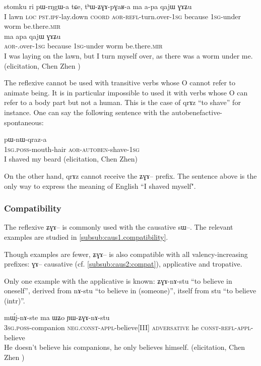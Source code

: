 \documentclass[oldfontcommands,oneside,a4paper,11pt]{memoir}
\newcommand{\ipa}[1]{{\phon #1}} %
\newcommand{\wav}[1]{}%
\newcommand{\appl}{\textsc{appl}}
\newcommand{\aor}{\textsc{aor}}
\newcommand{\auto}{\textsc{autoben}}
\newcommand{\coord}{\textsc{coord}}
\newcommand{\const}{\textsc{const}}
\newcommand{\ipf}{\textsc{ipf}}
\newcommand{\loc}{\textsc{loc}}
\newcommand{\mir}{\textsc{mir}}
\newcommand{\negat}{\textsc{neg}}
\newcommand{\poss}{\textsc{poss}}
\newcommand{\pst}{\textsc{pst}}
\newcommand{\refl}{\textsc{refl}}
\newcommand{\sg}{\textsc{sg}}
\begin{document}
   \begin{exe}
\ex
\begin{xlist}[(ii)]
\gll  \ipa{aʑo} 	\ipa{stomku} 	\ipa{ri} 	\ipa{pɯ-rŋgɯ-a} 	\ipa{tɕe,} 	\ipa{tʰɯ-ʑɣɤ-pɣaʁ-a} 	\ipa{ma} 	\ipa{a-pa} 	\ipa{qajɯ} 	\ipa{ɣɤʑu}  \\
I lawn \loc{} \pst{}.\ipf{}-lay.down \coord{} \aor{}-\refl{}-turn.over-1\sg{} because 1\sg{}-under worm be.there.\mir{} \\
\gll  \ipa{tʰɯ-mbɣaʁ-a} 	\ipa{ma} 	\ipa{apa} 	\ipa{qajɯ} 	\ipa{ɣɤʑu}  \\
 \aor{}-\aturn.over-1\sg{} because 1\sg{}-under worm be.there.\mir{} \\
  \glt  I was laying on the lawn, but I turn myself over, as there was a worm under me. (elicitation, Chen Zhen \wav{ZGApGaR})
  \end{xlist}
   \end{exe}
   
The reflexive cannot be used with transitive verbs whose O cannot refer to animate being. It is in particular impossible to used it with verbs whose O can refer to a body part but not a human. This is the case of \ipa{qrɤz} ``to shave'' for instance. One can say the following sentence with the autobenefactive-spontaneous:
       \begin{exe}
\ex
\gll \ipa{a-mtɕhi-rme} \ipa{pɯ-nɯ-qraz-a}\\
1\sg{}.\poss{}-mouth-hair \aor{}-\auto{}-shave-1\sg{}  \\
  \glt I shaved my beard (elicitation, Chen Zhen)
   \end{exe}
 On the other hand, \ipa{qrɤz} cannot receive the \ipa{ʑɣɤ}-- prefix. The sentence above is the only way to express the meaning of English ``I shaved myself".
 

\subsubsection{Compatibility}   \label{subsub:reflexive.compat}
The reflexive \ipa{ʑɣɤ}-- is commonly used with the causative \ipa{sɯ}--. The relevant examples are studied in \ref{subsub:caus1.compatibility}. 

Though examples are fewer, \ipa{ʑɣɤ}-- is also compatible with all valency-increasing prefixes: \ipa{ɣɤ}-- causative (cf. \ref{subsub:caus2:compat}), applicative and tropative.

Only one example with the applicative is known: \ipa{ʑɣɤ-nɤ-stu} ``to believe in oneself'', derived from \ipa{nɤ-stu} ``to believe in (someone)'', itself from \ipa{stu} ``to believe (intr)''.
   \begin{exe}
\ex
\gll \ipa{ɯ-zda} 	\ipa{mɯ́j-nɤ-ste} 	\ipa{ma} 	\ipa{ɯʑo} 	\ipa{ɲɯ-ʑɣɤ-nɤ-stu}   \\
3\sg{}.\poss{}-companion \negat{}.\const{}-\appl{}-believe[III] \textsc{adversative} he \const{}-\refl{}-\appl{}-believe      \\
  \glt He doesn't believe his companions, he only believes himself. (elicitation, Chen Zhen \wav{8_ZGAnAstu}) 
   \end{exe}
   
\end{document}
